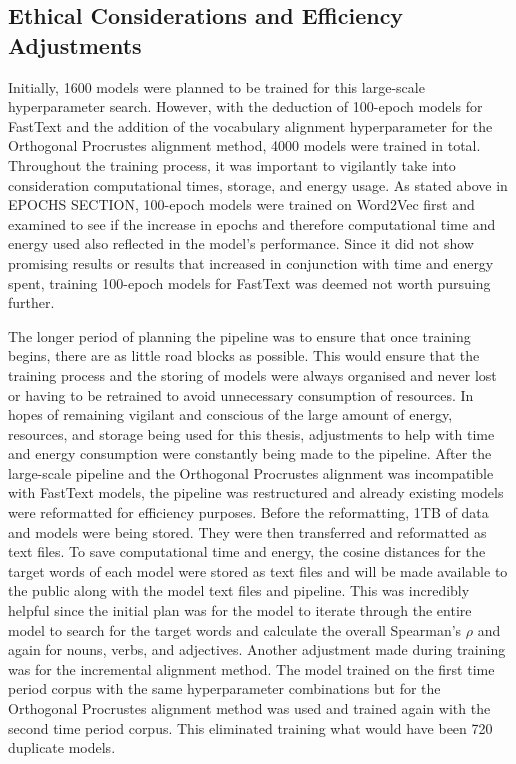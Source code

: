 \subsection{Ethical Considerations and Efficiency Adjustments}
\label{exp-ethics}
Initially, 1600 models were planned to be trained for this large-scale hyperparameter search. However, with the deduction of 100-epoch models for FastText and the addition of the vocabulary alignment hyperparameter for the Orthogonal Procrustes alignment method, 4000 models were trained in total. Throughout the training process, it was important to vigilantly take into consideration computational times, storage, and energy usage. As stated above in EPOCHS SECTION, 100-epoch models were trained on Word2Vec first and examined to see if the increase in epochs and therefore computational time and energy used also reflected in the model’s performance. Since it did not show promising results or results that increased in conjunction with time and energy spent, training 100-epoch models for FastText was deemed not worth pursuing further. 

The longer period of planning the pipeline was to ensure that once training begins, there are as little road blocks as possible. This would ensure that the training process and the storing of models were always organised and never lost or having to be retrained to avoid unnecessary consumption of resources. In hopes of remaining vigilant and conscious of the large amount of energy, resources, and storage being used for this thesis, adjustments to help with time and energy consumption were constantly being made to the pipeline. After the large-scale pipeline and the Orthogonal Procrustes alignment was incompatible with FastText models, the pipeline was restructured and already existing models were reformatted for efficiency purposes. Before the reformatting, 1TB of data and models were being stored. They were then transferred and reformatted as text files. To save computational time and energy, the cosine distances for the target words of each model were stored as text files and will be made available to the public along with the model text files and pipeline. This was incredibly helpful since the initial plan was for the model to iterate through the entire model to search for the target words and calculate the overall Spearman’s $\rho$ and again for nouns, verbs, and adjectives. Another adjustment made during training was for the incremental alignment method. The model trained on the first time period corpus with the same hyperparameter combinations but for the Orthogonal Procrustes alignment method was used and trained again with the second time period corpus. This eliminated training what would have been 720 duplicate models.  


